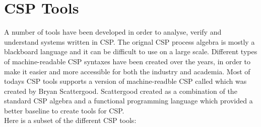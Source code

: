 \section{CSP Tools}
A number of tools have been developed in order to analyse, verify and understand systems written in CSP. The orignal CSP process algebra is mostly a blackboard language and it can be difficult to use on a large scale. Different types of machine-readable CSP syntaxes have been created over the years, in order to make it easier and more accessible for both the industry and academia. Most of todays CSP tools supports a version of machine-readble CSP called \cspm{} which was created by Bryan Scattergood\cite{Scattergood1998}. Scattergood created \cspm{} as a combination of the standard CSP algebra and a functional programming language which provided a better baseline to create tools for CSP.\\
Here is a subset of the different CSP tools:
